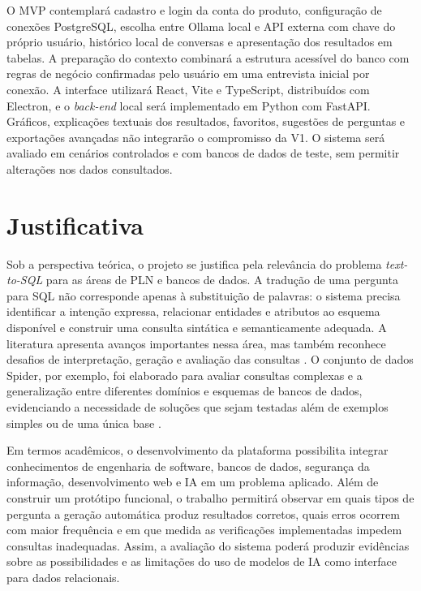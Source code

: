 O MVP contemplará cadastro e login da conta do produto, configuração de conexões PostgreSQL, escolha entre Ollama local e API externa com chave do próprio usuário, histórico local de conversas e apresentação dos resultados em tabelas. A preparação do contexto combinará a estrutura acessível do banco com regras de negócio confirmadas pelo usuário em uma entrevista inicial por conexão. A interface utilizará React, Vite e TypeScript, distribuídos com Electron, e o \textit{back-end} local será implementado em Python com FastAPI. Gráficos, explicações textuais dos resultados, favoritos, sugestões de perguntas e exportações avançadas não integrarão o compromisso da V1. O sistema será avaliado em cenários controlados e com bancos de dados de teste, sem permitir alterações nos dados consultados.

\section{Justificativa}

Sob a perspectiva teórica, o projeto se justifica pela relevância do problema \textit{text-to-SQL} para as áreas de PLN e bancos de dados. A tradução de uma pergunta para SQL não corresponde apenas à substituição de palavras: o sistema precisa identificar a intenção expressa, relacionar entidades e atributos ao esquema disponível e construir uma consulta sintática e semanticamente adequada. A literatura apresenta avanços importantes nessa área, mas também reconhece desafios de interpretação, geração e avaliação das consultas \cite{deng2022recent}. O conjunto de dados Spider, por exemplo, foi elaborado para avaliar consultas complexas e a generalização entre diferentes domínios e esquemas de bancos de dados, evidenciando a necessidade de soluções que sejam testadas além de exemplos simples ou de uma única base \cite{yu2018spider}.

Em termos acadêmicos, o desenvolvimento da plataforma possibilita integrar conhecimentos de engenharia de software, bancos de dados, segurança da informação, desenvolvimento web e IA em um problema aplicado. Além de construir um protótipo funcional, o trabalho permitirá observar em quais tipos de pergunta a geração automática produz resultados corretos, quais erros ocorrem com maior frequência e em que medida as verificações implementadas impedem consultas inadequadas. Assim, a avaliação do sistema poderá produzir evidências sobre as possibilidades e as limitações do uso de modelos de IA como interface para dados relacionais.

